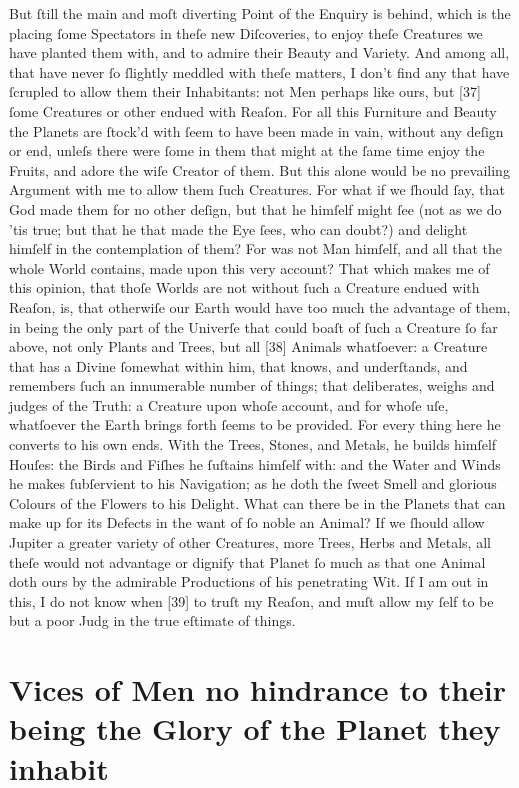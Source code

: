 \documentclass[letterpaper]{book}
\begin{document}
But ſtill the main and moſt diverting Point of the Enquiry is behind, which
is the placing ſome Spectators in theſe new Diſcoveries, to enjoy theſe
Creatures we have planted them with, and to admire their Beauty and
Variety.  And among all, that have never ſo ſlightly meddled with theſe
matters, I don't find any that have ſcrupled to allow them their
Inhabitants: not Men perhaps like ours, but [37] ſome Creatures or other
endued with Reaſon.  For all this Furniture and Beauty the Planets are
ſtock'd with ſeem to have been made in vain, without any deſign or end,
unleſs there were ſome in them that might at the ſame time enjoy the Fruits,
and adore the wiſe Creator of them. But this alone would be no prevailing
Argument with me to allow them ſuch Creatures. For what if we ſhould ſay,
that God made them for no other deſign, but that he himſelf might ſee (not
as we do 'tis true; but that he that made the Eye ſees, who can doubt?) and
delight himſelf in the contemplation of them? For was not Man himſelf, and
all that the whole World contains, made upon this very account? That which
makes me of this opinion, that thoſe Worlds are not without ſuch a Creature endued with Reaſon, is, that otherwiſe our Earth would have too much
the advantage of them, in being the only part of the Univerſe that could
boaſt of ſuch a Creature ſo far above, not only Plants and Trees, but all
[38] Animals whatſoever: a Creature that has a Divine ſomewhat within him,
that knows, and underſtands, and remembers ſuch an innumerable number of
things; that deliberates, weighs and judges of the Truth: a Creature upon
whoſe account, and for whoſe uſe, whatſoever the Earth brings forth ſeems to
be provided. For every thing here he converts to his own ends. With the
Trees, Stones, and Metals, he builds himſelf Houſes: the Birds and Fiſhes he
ſuſtains himſelf with: and the Water and Winds he makes ſubſervient to his
Navigation; as he doth the ſweet Smell and glorious Colours of the Flowers
to his Delight. What can there be in the Planets that can make up for its
Defects in the want of ſo noble an Animal? If we ſhould allow Jupiter a
greater variety of other Creatures, more Trees, Herbs and Metals, all theſe
would not advantage or dignify that Planet ſo much as that one Animal doth
ours by the admirable Productions of his penetrating Wit. If I am out in
this, I do not know when [39] to truſt my Reaſon, and muſt allow my ſelf to
be but a poor Judg in the true eſtimate of things.


\section{Vices of Men no hindrance to their being the Glory of the Planet
they inhabit}
\end{document}
